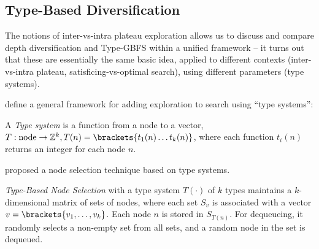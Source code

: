 \subsection{Type-Based Diversification}

The notions of inter-vs-intra plateau exploration allows us to discuss and compare depth diversification \cite{Asai2016} and Type-GBFS \cite{xie14type} within a unified framework
 -- it turns out that
these are essentially the same basic idea,  applied to different contexts (inter-vs-intra plateau, satisficing-vs-optimal search), using different parameters (type systems).

\citeauthor{lelis2013stratified} \citeyear{lelis2013stratified} define a general framework for adding exploration to search using ``type systems'':


\begin{defi} 
A \emph{Type system} \cite{lelis2013stratified} is a 
function from a node to a vector,
$T: \text{node} \rightarrow \mathbb{Z}^k, T(n)=\brackets{t_1(n) \ldots t_k(n)} $, where each function $t_i(n)$ returns an integer for each node $n$.
\end{defi}


\citeauthor{xie14type} proposed a node selection technique based on type systems.

\begin{defi}
 \emph{Type-Based Node Selection} \cite{xie14type}
with a type system $T(\cdot)$ of $k$ types maintains a $k$-dimensional matrix of sets of nodes,
 where each set $S_v$ is associated with a vector $v=\brackets{v_1,\ldots,v_k}$.
 Each node $n$ is stored in $S_{T(n)}$.
 For dequeueing, it randomly selects a non-empty set from all sets,
 and a random node in the set is dequeued.
\end{defi}

